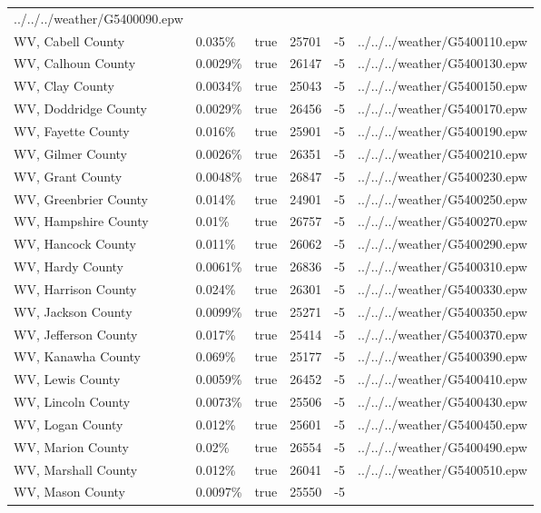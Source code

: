 \begin{longtable}[]{@{}llllll@{}}
../../../weather/G5400090.epw \\
WV, Cabell County & 0.035\% & true & 25701 & -5 &
../../../weather/G5400110.epw \\
WV, Calhoun County & 0.0029\% & true & 26147 & -5 &
../../../weather/G5400130.epw \\
WV, Clay County & 0.0034\% & true & 25043 & -5 &
../../../weather/G5400150.epw \\
WV, Doddridge County & 0.0029\% & true & 26456 & -5 &
../../../weather/G5400170.epw \\
WV, Fayette County & 0.016\% & true & 25901 & -5 &
../../../weather/G5400190.epw \\
WV, Gilmer County & 0.0026\% & true & 26351 & -5 &
../../../weather/G5400210.epw \\
WV, Grant County & 0.0048\% & true & 26847 & -5 &
../../../weather/G5400230.epw \\
WV, Greenbrier County & 0.014\% & true & 24901 & -5 &
../../../weather/G5400250.epw \\
WV, Hampshire County & 0.01\% & true & 26757 & -5 &
../../../weather/G5400270.epw \\
WV, Hancock County & 0.011\% & true & 26062 & -5 &
../../../weather/G5400290.epw \\
WV, Hardy County & 0.0061\% & true & 26836 & -5 &
../../../weather/G5400310.epw \\
WV, Harrison County & 0.024\% & true & 26301 & -5 &
../../../weather/G5400330.epw \\
WV, Jackson County & 0.0099\% & true & 25271 & -5 &
../../../weather/G5400350.epw \\
WV, Jefferson County & 0.017\% & true & 25414 & -5 &
../../../weather/G5400370.epw \\
WV, Kanawha County & 0.069\% & true & 25177 & -5 &
../../../weather/G5400390.epw \\
WV, Lewis County & 0.0059\% & true & 26452 & -5 &
../../../weather/G5400410.epw \\
WV, Lincoln County & 0.0073\% & true & 25506 & -5 &
../../../weather/G5400430.epw \\
WV, Logan County & 0.012\% & true & 25601 & -5 &
../../../weather/G5400450.epw \\
WV, Marion County & 0.02\% & true & 26554 & -5 &
../../../weather/G5400490.epw \\
WV, Marshall County & 0.012\% & true & 26041 & -5 &
../../../weather/G5400510.epw \\
WV, Mason County & 0.0097\% & true & 25550 & -5 &

\end{longtable}
